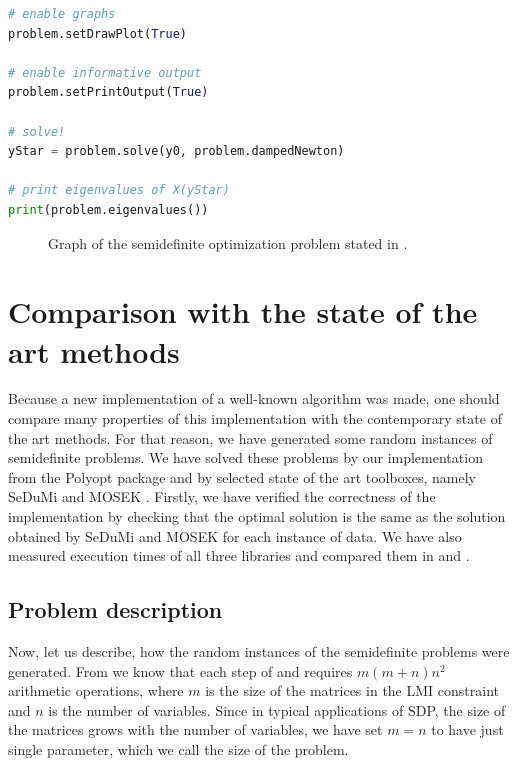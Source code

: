 \begin{example}
\begin{lstlisting}[float, language=python, caption={Code for solving semidefinite problem stated in \refex{SDP:imp:demo}.}, labellis={SDP:imp:demo}]
# enable graphs
problem.setDrawPlot(True)

# enable informative output
problem.setPrintOutput(True)

# solve!
yStar = problem.solve(y0, problem.dampedNewton)

# print eigenvalues of X(yStar)
print(problem.eigenvalues())
  \end{lstlisting}

  \begin{figure}[ht]
    \centering
    \resizebox{0.95\textwidth}{!}{}
    \caption{Graph of the semidefinite optimization problem stated in .}
  \end{figure}
\end{example}

\section{Comparison with the state of the art methods}

Because a new implementation of a well-known algorithm was made, one should compare many properties of this implementation with the contemporary state of the art methods.
For that reason, we have generated some random instances of semidefinite problems.
We have solved these problems by our implementation from the Polyopt package and by selected state of the art toolboxes, namely SeDuMi \cite{sedumi} and MOSEK \cite{mosek}.
Firstly, we have verified the correctness of the implementation by checking that the optimal solution is the same as the solution obtained by SeDuMi and MOSEK for each instance of data.
We have also measured execution times of all three libraries and compared them in  and .

\subsection{Problem description}
Now, let us describe, how the random instances of the semidefinite problems were generated.
From  we know that each step of  and  requires $m(m+n)n^2$ arithmetic operations, where $m$ is the size of the matrices in the LMI constraint and $n$ is the number of variables.
Since in typical applications of SDP, the size of the matrices grows with the number of variables, we have set $m = n$ to have just single parameter, which we call the size of the problem.

